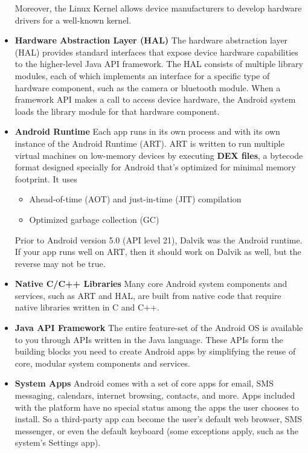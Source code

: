 \begin{itemize}
	Moreover, the Linux Kernel  allows device manufacturers to develop hardware drivers for a well-known kernel.
	\item \textbf{Hardware Abstraction Layer (HAL)} The hardware abstraction layer (HAL) provides standard interfaces that expose device hardware capabilities to the higher-level Java API framework.
		The HAL consists of multiple library modules, each of which implements an interface for a specific type of hardware component, such as the camera or bluetooth module.
		When a framework API makes a call to access device hardware, the Android system loads the library module for that hardware component.
	\item \textbf{Android Runtime} Each app runs in its own process and with its own instance of the Android Runtime (ART).
		ART is written to run multiple virtual machines on low-memory devices by executing \textbf{DEX files}, a bytecode format designed specially for Android that's optimized for minimal memory footprint.
		It uses
		\begin{itemize}
			\item Ahead-of-time (AOT) and just-in-time (JIT) compilation \cite{}
			\item Optimized garbage collection (GC)
		\end{itemize}
		Prior to Android version 5.0 (API level 21), Dalvik was the Android runtime.
		If your app runs well on ART, then it should work on Dalvik as well, but the reverse may not be true.
	\item \textbf{Native C/C++ Libraries} Many core Android system components and services, such as ART and HAL, are built from native code that require native libraries written in C and C++.
	\item \textbf{Java API Framework} The entire feature-set of the Android OS is available to you through APIs written in the Java language.
		These APIs form the building blocks you need to create Android apps by simplifying the reuse of core, modular system components and services.
	\item \textbf{System Apps} Android comes with a set of core apps for email, SMS messaging, calendars, internet browsing, contacts, and more.
		Apps included with the platform have no special status among the apps the user chooses to install.
		So a third-party app can become the user's default web browser, SMS messenger, or even the default keyboard (some exceptions apply, such as the system's Settings app).
\end{itemize}




